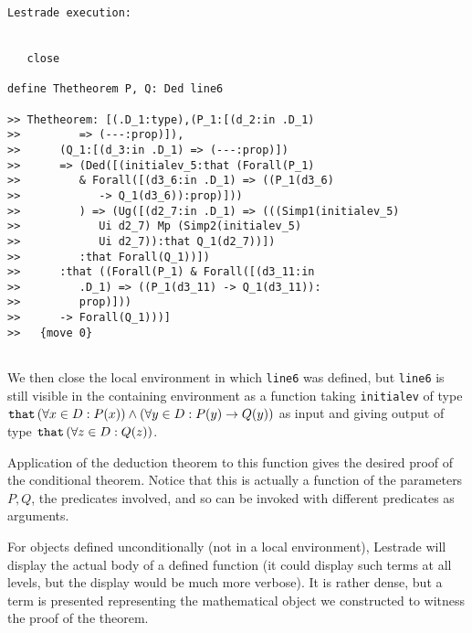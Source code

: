 \documentclass{slides}
\begin{document}
\begin{slide}
{\small 
\begin{verbatim}Lestrade execution:


   close

define Thetheorem P, Q: Ded line6

>> Thetheorem: [(.D_1:type),(P_1:[(d_2:in .D_1)
>>         => (---:prop)]),
>>      (Q_1:[(d_3:in .D_1) => (---:prop)])
>>      => (Ded([(initialev_5:that (Forall(P_1)
>>         & Forall([(d3_6:in .D_1) => ((P_1(d3_6)
>>            -> Q_1(d3_6)):prop)]))
>>         ) => (Ug([(d2_7:in .D_1) => (((Simp1(initialev_5)
>>            Ui d2_7) Mp (Simp2(initialev_5)
>>            Ui d2_7)):that Q_1(d2_7))])
>>         :that Forall(Q_1))])
>>      :that ((Forall(P_1) & Forall([(d3_11:in
>>         .D_1) => ((P_1(d3_11) -> Q_1(d3_11)):
>>         prop)]))
>>      -> Forall(Q_1)))]
>>   {move 0}


\end{verbatim}
}

\end{slide}

\begin{slide}

We then close the local environment in which {\tt line6} was defined, but {\tt line6} is still visible in the containing environment as a function taking {\tt initialev}
of type ${\tt that} \, (\forall x \in D:P(x)) \wedge (\forall y \in D:P(y) \rightarrow Q(y))$ as input and giving output of type ${\tt that}\,(\forall z \in D:Q(z))$.

Application of the deduction theorem to this function gives the desired proof of the conditional theorem.  Notice that this is actually a function of the
parameters $P,Q$, the predicates involved, and so can be invoked with different predicates as arguments.

For objects defined unconditionally (not in a local environment), Lestrade will display the actual body of a defined function (it could display such terms at all levels, but the display would be much more verbose).  It is rather dense, but a term is presented representing the mathematical object we constructed to witness the proof of the theorem.

\end{slide}
\end{document}
